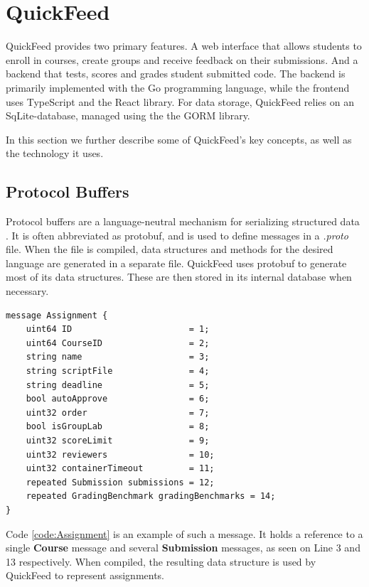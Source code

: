 \section{QuickFeed}

QuickFeed provides two primary features.
A web interface that allows students to enroll in courses, create groups and receive feedback on their submissions.
And a backend that tests, scores and grades student submitted code.
The backend is primarily implemented with the Go programming language, while the frontend uses TypeScript and the React library.
For data storage, QuickFeed relies on an SqLite-database, managed using the the GORM library.

In this section we further describe some of QuickFeed's key concepts, as well as the technology it uses.

\subsection{Protocol Buffers}

Protocol buffers are a language-neutral mechanism for serializing structured data \cite{protobuf}.
It is often abbreviated as protobuf, and is used to define messages in a \textit{.proto} file.
When the file is compiled, data structures and methods for the desired language are generated in a separate file.
QuickFeed uses protobuf to generate most of its data structures.
These are then stored in its internal database when necessary.

\begin{lstlisting}[caption={Assignment message}, label={code:Assignment}]
message Assignment {
    uint64 ID                       = 1;
    uint64 CourseID                 = 2;
    string name                     = 3;
    string scriptFile               = 4;
    string deadline                 = 5;
    bool autoApprove                = 6;
    uint32 order                    = 7;
    bool isGroupLab                 = 8;
    uint32 scoreLimit               = 9;
    uint32 reviewers                = 10;
    uint32 containerTimeout         = 11;
    repeated Submission submissions = 12;
    repeated GradingBenchmark gradingBenchmarks = 14;
}
\end{lstlisting}

Code \ref{code:Assignment} is an example of such a message.
It holds a reference to a single \textbf{Course} message and several \textbf{Submission} messages, as seen on Line 3 and 13 respectively.
When compiled, the resulting data structure is used by QuickFeed to represent assignments.


